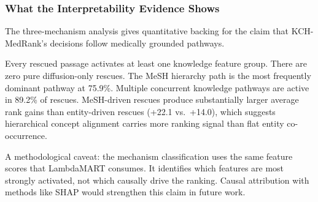 \subsubsection{What the Interpretability Evidence Shows}

The three-mechanism analysis gives quantitative backing for the claim that KCH-MedRank's decisions follow medically grounded pathways.

Every rescued passage activates at least one knowledge feature group. There are zero pure diffusion-only rescues. The MeSH hierarchy path is the most frequently dominant pathway at 75.9\%. Multiple concurrent knowledge pathways are active in 89.2\% of rescues. MeSH-driven rescues produce substantially larger average rank gains than entity-driven rescues (+22.1 vs.\ +14.0), which suggests hierarchical concept alignment carries more ranking signal than flat entity co-occurrence.

A methodological caveat: the mechanism classification uses the same feature scores that LambdaMART consumes. It identifies which features are most strongly activated, not which causally drive the ranking. Causal attribution with methods like SHAP would strengthen this claim in future work.
